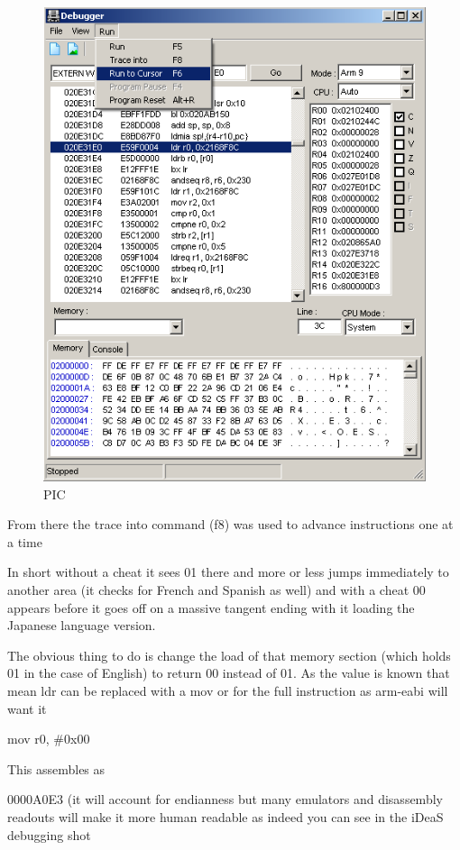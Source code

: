 \documentclass[
]{book}
\begin{document}
\begin{figure}
\centering
\includegraphics{images/218_home_fast6191_romhackingguide_unrenamed_fil___iginal_borders_romhackguideasmlanguagemod_3.png}
\caption{PIC}
\end{figure}

From there the trace into command (f8) was used to advance instructions one at a time

In short without a cheat it sees 01 there and more or less jumps immediately to another area (it checks for French and Spanish as well) and with a cheat 00 appears before it goes off on a massive tangent ending with it loading the Japanese language version.

The obvious thing to do is change the load of that memory section (which holds 01 in the case of English) to return 00 instead of 01. As the value is known that mean ldr can be replaced with a mov or for the full instruction as arm-eabi will want it

mov r0, \#0x00

This assembles as

0000A0E3 (it will account for endianness but many emulators and disassembly readouts will make it more human readable as indeed you can see in the iDeaS debugging shot
\end{document}
